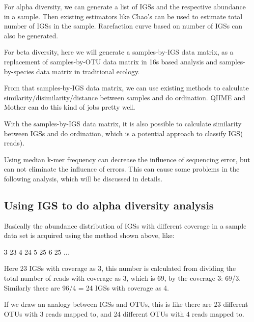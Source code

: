 \documentclass{article}
\begin{document}
For alpha diversity, we can generate a list of IGSs and the respective abundance in a sample. Then existing estimators like Chao's can be used to estimate total number of IGSs in the sample. Rarefaction curve based on number of IGSs can also be generated. 

For beta diversity, here we will generate a samples-by-IGS data matrix, as a replacement of samples-by-OTU data matrix in 16s based analysis and samples-by-species data matrix in traditional ecology. 


From that samples-by-IGS data matrix, we can use existing methods to calculate similarity/disimilarity/distance between samples and do ordination. QIIME and Mother can do this kind of jobs pretty well.

With the samples-by-IGS data matrix, it is also possible to calculate similarity between IGSs and do ordination, which is a potential approach to classify IGS( reads).

Using median k-mer frequency can decrease the influence of sequencing error, but can not eliminate the influence of errors. This can cause some problems in the following analysis, which will be discussed in details.




\subsection{Using IGS to do alpha diversity analysis}


Basically the abundance distribution of IGSs with different coverage in a sample data set is acquired using the method shown above, like:

    3 23
    4 24
    5 25
    6 25
    ...

Here 23 IGSs with coverage as 3, this number is calculated from dividing the total number of reads with coverage as 3, which is 69, by the coverage 3: 69/3. Similarly there are 96/4 = 24 IGSs with coverage as 4.

If we draw an analogy between IGSs and OTUs, this is like there are 23 different OTUs with 3 reads mapped to, and 24 different OTUs with 4 reads mapped to. 
\end{document}
